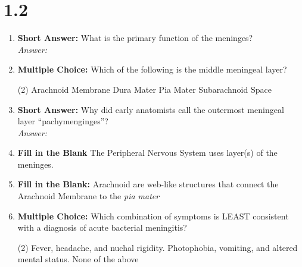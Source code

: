 \section*{1.2}
\begin{enumerate}[label=\textbf{Q1.2.\arabic*}]
      \item \textbf{Short Answer:} What is the primary function of the meninges? \\
            \textit{Answer:} \\%

      \item \textbf{Multiple Choice:} Which of the following is the middle meningeal layer?
            \begin{tasks}[label=(\Alph*), label-width=1.5em, item-indent=1.7em](2) %
                  \task Arachnoid Membrane
                  \task Dura Mater
                  \task Pia Mater
                  \task Subarachnoid Space
            \end{tasks}

      \item \textbf{Short Answer:} Why did early anatomists call the outermost meningeal layer ``pachymenginges''? \\
            \textit{Answer:} \\%

      \item \textbf{Fill in the Blank} The Peripheral Nervous System uses \underline{\hspace{3cm}} layer(s) of the meninges. \\

      \item \textbf{Fill in the Blank:} Arachnoid \underline{\hspace{3cm}} are web-like structures that connect the Arachnoid Membrane to the \textit{pia mater}

      \item \textbf{Multiple Choice:} Which combination of symptoms is LEAST consistent with a diagnosis of acute bacterial meningitis?
            \begin{tasks}[label=(\Alph*), label-width=1.5em, item-indent=1.7em](2)
                  \task Fever, headache, and nuchal rigidity.
                  \task Photophobia, vomiting, and altered mental status.
                  \task None of the above
            \end{tasks}


\end{enumerate}
